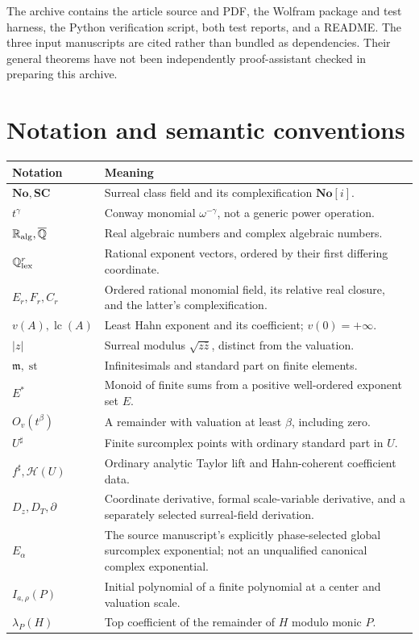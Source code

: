\documentclass[11pt,letterpaper]{article}
\numberwithin{equation}{section}
\theoremstyle{definition}
\theoremstyle{remark}\newtheorem{remark}[theorem]{Remark}
\newcommand{\No}{\mathbf{No}}
\newcommand{\SC}{\mathbf{SC}}
\newcommand{\Q}{\mathbb Q}
\newcommand{\RA}{\mathbb R_{\rm alg}}
\newcommand{\CA}{\overline{\mathbb Q}}
\newcommand{\mm}{\mathfrak m}
\newcommand{\HH}{\mathscr H}
\newcommand{\st}{\operatorname{st}}
\newcommand{\lc}{\operatorname{lc}}
\newcommand{\sh}{^{\sharp}}
\newcommand{\Oh}[1]{O_v(t^{#1})}
\begin{document}
The archive contains the article source and PDF, the Wolfram package and test
harness, the Python verification script, both test reports, and a README.
The three input manuscripts are cited rather than bundled as dependencies.
Their general theorems have not been independently proof-assistant checked in
preparing this archive.

\section{Notation and semantic conventions}
\begingroup\small
\begin{longtable}{@{}P{0.25\textwidth}P{0.68\textwidth}@{}}
\toprule
Notation & Meaning\\
\midrule
\endhead
$\No,\SC$ & Surreal class field and its complexification $\No[i]$.\\[0.3em]
$t^\gamma$ & Conway monomial $\omega^{-\gamma}$, not a generic power operation.\\[0.3em]
$\RA,\CA$ & Real algebraic numbers and complex algebraic numbers.\\[0.3em]
$\Q^r_{\rm lex}$ & Rational exponent vectors, ordered by their first differing coordinate.\\[0.3em]
$E_r,F_r,C_r$ & Ordered rational monomial field, its relative real closure,
and the latter's complexification.\\[0.3em]
$v(A),\lc(A)$ & Least Hahn exponent and its coefficient; $v(0)=+\infty$.\\[0.3em]
$|z|$ & Surreal modulus $\sqrt{z\bar z}$, distinct from the valuation.\\[0.3em]
$\mm,\st$ & Infinitesimals and standard part on finite elements.\\[0.3em]
$E^*$ & Monoid of finite sums from a positive well-ordered exponent set $E$.\\[0.3em]
$\Oh\beta$ & A remainder with valuation at least $\beta$, including zero.\\[0.3em]
$U\sh$ & Finite surcomplex points with ordinary standard part in $U$.\\[0.3em]
$f\sh,\HH(U)$ & Ordinary analytic Taylor lift and Hahn-coherent coefficient data.\\[0.3em]
$D_z,D_T,\partial$ & Coordinate derivative, formal scale-variable derivative,
and a separately selected surreal-field derivation.\\[0.3em]
$E_\alpha$ & The source manuscript's explicitly phase-selected global
surcomplex exponential; not an unqualified canonical complex exponential.\\[0.3em]
$I_{a,\rho}(P)$ & Initial polynomial of a finite polynomial at a center and valuation scale.\\[0.3em]
$\lambda_P(H)$ & Top coefficient of the remainder of $H$ modulo monic $P$.\\
\bottomrule
\end{longtable}
\endgroup
\end{document}

